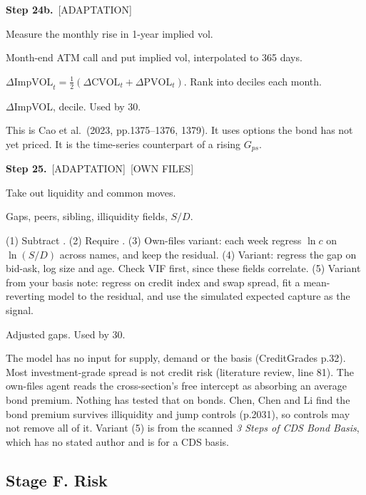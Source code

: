 \documentclass[10pt,a4paper]{article}
\newcommand{\OWN}{\textsf{\footnotesize\textcolor{tagother}{[OWN FILES]}}}
\newcommand{\ADAPT}{\textsf{\footnotesize\textcolor{tagadapt}{[ADAPTATION]}}}
\newenvironment{step}[3]{%
  \par\needspace{5\baselineskip}\medskip\noindent\textbf{Step #1.}\ \fn{#2}\hfill#3\par\nopagebreak\small
  \begin{description}[style=sameline,leftmargin=1.7cm,labelwidth=1.5cm,labelsep=0.2cm,itemsep=1pt,parsep=0pt,topsep=1pt,font=\small\bfseries]
}{\end{description}\normalsize}
\newcommand{\Gps}{G_{ps}}
\begin{document}
\begin{step}{24b}{impvol_change}{\ADAPT}
\item[Purpose] Measure the monthly rise in 1-year implied vol.
\item[Inputs] Month-end ATM call and put implied vol, interpolated to 365 days.
\item[Formula] $\Delta\text{ImpVOL}_t=\tfrac12(\Delta\text{CVOL}_t+\Delta\text{PVOL}_t)$. Rank into deciles each month.
\item[Outputs] $\Delta$ImpVOL, decile. Used by 30.
\item[Why] This is Cao et al.\ (2023, pp.1375--1376, 1379). It uses options the bond has not yet priced. It is the time-series counterpart of a rising $\Gps$.
\end{step}

\begin{step}{25}{control_gaps}{\ADAPT\ \OWN}
\item[Purpose] Take out liquidity and common moves.
\item[Inputs] Gaps, peers, sibling, illiquidity fields, $S/D$.
\item[Formula] (1) Subtract . (2) Require . (3) Own-files variant: each week regress $\ln c$ on $\ln(S/D)$ across names, and keep the residual. (4) Variant: regress the gap on bid-ask, log size and age. Check VIF first, since these fields correlate. (5) Variant from your basis note: regress on credit index and swap spread, fit a mean-reverting model to the residual, and use the simulated expected capture as the signal.
\item[Outputs] Adjusted gaps. Used by 30.
\item[Why] The model has no input for supply, demand or the basis (CreditGrades p.32). Most investment-grade spread is not credit risk (literature review, line 81). The own-files agent reads the cross-section's free intercept as absorbing an average bond premium. Nothing has tested that on bonds. Chen, Chen and Li find the bond premium survives illiquidity and jump controls (p.2031), so controls may not remove all of it. Variant (5) is from the scanned \emph{3 Steps of CDS Bond Basis}, which has no stated author and is for a CDS basis.
\end{step}

\subsection*{Stage F. Risk}
\end{document}
